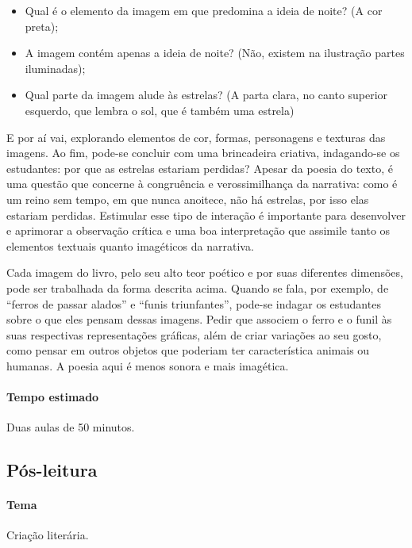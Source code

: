 \documentclass[11pt]{extarticle}
\begin{document}
\begin{itemize}
\item Qual é o elemento da imagem em que predomina a ideia de noite? (A cor preta);
\item A imagem contém apenas a ideia de noite? (Não, existem na ilustração partes iluminadas);
\item Qual parte da imagem alude às estrelas? (A parta clara, no canto superior esquerdo, que lembra o sol, que é também uma estrela)
\end{itemize}

E por aí vai, explorando elementos de cor, formas, personagens e texturas das imagens. Ao fim, pode-se concluir com uma brincadeira criativa, indagando-se os estudantes: por que as estrelas estariam perdidas? Apesar da poesia do texto, é uma questão que concerne à congruência e verossimilhança da narrativa: como é um reino sem tempo, em que nunca anoitece, não há estrelas, por isso elas estariam perdidas. Estimular esse tipo de interação é importante para desenvolver e aprimorar a observação crítica e uma boa interpretação que assimile tanto os elementos textuais quanto imagéticos da narrativa.

Cada imagem do livro, pelo seu alto teor poético e por suas diferentes dimensões, pode ser trabalhada da forma descrita acima.
Quando se fala, por exemplo, de ``ferros de passar alados'' e ``funis triunfantes'',
pode-se indagar os estudantes sobre o que eles pensam dessas imagens. Pedir que associem o ferro e o funil às suas respectivas representações gráficas, além de criar variações ao seu gosto, como pensar em outros objetos que poderiam ter característica animais ou humanas. A poesia aqui é menos sonora e mais imagética.

\paragraph{Tempo estimado} Duas aulas de 50 minutos.

\subsection{Pós-leitura}



\paragraph{Tema} Criação literária.
\end{document}
